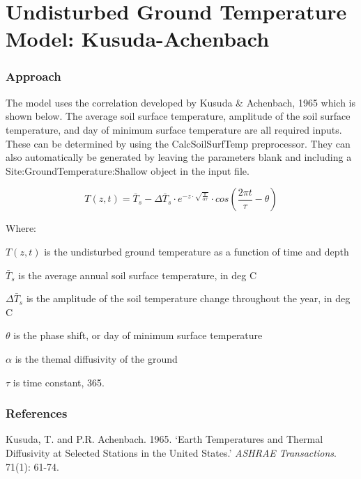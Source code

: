 \section{Undisturbed Ground Temperature Model: Kusuda-Achenbach}\label{undisturbed-ground-temperature-model-kusuda-achenbach}

\subsubsection{Approach}\label{approach-004}

The model uses the correlation developed by Kusuda \& Achenbach, 1965 which is shown below. The average soil surface temperature, amplitude of the soil surface temperature, and day of minimum surface temperature are all required inputs. These can be determined by using the CalcSoilSurfTemp preprocessor. They can also automatically be generated by leaving the parameters blank and including a Site:GroundTemperature:Shallow object in the input file.

\begin{equation}
T(z,t) = \bar{T}_{s} - \Delta\bar{T}_{s} \cdot e^{-z \cdot \sqrt{\frac{\pi}{\alpha\tau}}} \cdot cos\left( \frac{2\pi t}{\tau} - \theta \right)
\end{equation}

Where:

\(T(z,t)\) is the undisturbed ground temperature as a function of time and depth

\(\bar{T}_{s}\) is the average annual soil surface temperature, in deg C

\(\Delta\bar{T}_{s}\) is the amplitude of the soil temperature change throughout the year, in deg C

\(\theta\) is the phase shift, or day of minimum surface temperature

\(\alpha\) is the themal diffusivity of the ground

\(\tau\) is time constant, 365.

\subsubsection{References}\label{references-049}

Kusuda, T. and P.R. Achenbach. 1965. `Earth Temperatures and Thermal Diffusivity at Selected Stations in the United States.' \emph{ASHRAE Transactions}. 71(1): 61-74.
